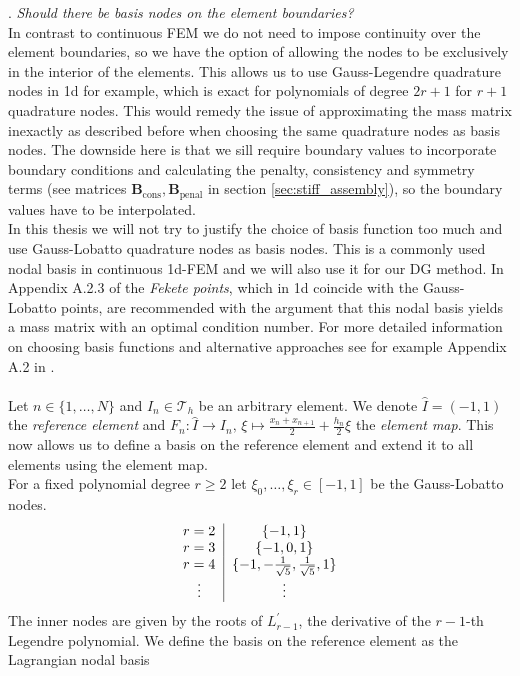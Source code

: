 . \textit{Should there be basis nodes on the element boundaries?} \\
In contrast to continuous FEM we do not need to impose continuity over the element boundaries, so we have the option of allowing 
the nodes to be exclusively in the interior of the elements. This allows us to use Gauss-Legendre quadrature nodes in 1d for example, 
which is exact for polynomials of degree $2r+1$ for $r+1$ quadrature nodes. This would remedy the issue of approximating the mass matrix inexactly as described before when 
choosing the same quadrature nodes as basis nodes. The downside here is that we sill require boundary values to incorporate boundary conditions and calculating 
the penalty, consistency and symmetry terms (see matrices $\textbf{B}_{\text{cons}}, \textbf{B}_{\text{penal}} $ in section \ref{sec:stiff_assembly}), 
so the boundary values have to be interpolated. \\ 

In this thesis we will not try to justify the choice of basis function too much and use Gauss-Lobatto quadrature nodes as basis nodes.
This is a commonly used nodal basis in continuous 1d-FEM and we will also use it for our DG method. In Appendix A.2.3 of \cite{diPietro2012} the \textit{Fekete points}, which 
in 1d coincide with the Gauss-Lobatto points, are recommended 
with the argument that this nodal basis yields a mass matrix with an optimal condition number. 
For more detailed information on choosing basis functions and alternative approaches see for example
Appendix A.2 in \cite{diPietro2012}. \\ \\
Let $n\in \{1,\ldots,N\}$ and $I_n \in \mathcal{T}_h$ be an arbitrary element.
We denote $\hat{I} = (-1,1)$ the \textit{reference element} and $\displaystyle F_n : \hat{I} \to I_n, \, \xi \mapsto \frac{x_n + x_{n+1}}{2} + \frac{h_n}{2} \xi $
the \textit{element map}. This now allows us to define a basis on the reference element and
extend it to all elements using the element map. \\
For a fixed polynomial degree $r \geq 2$ let $\xi_0,\ldots,\xi_{r} \in [-1,1]$ be the
Gauss-Lobatto nodes. \\
\begin{equation*}
	\begin{tabular}{c|c}
		\centering
		$r = 2$ & $\{-1, 1\}$                                         \\
		$r = 3$ & $\{-1,0, 1\}$                                       \\
		$r = 4$ & $\{-1,-\frac{1}{\sqrt{5}}, \frac{1}{\sqrt{5}}, 1\}$ \\
		\vdots  & \vdots                                              \\
	\end{tabular}
\end{equation*}
The inner nodes are given by the roots of $L_{r-1}^{\prime}$, the derivative of the $r-1$-th Legendre polynomial.
We define the basis on the reference element as the Lagrangian nodal basis

